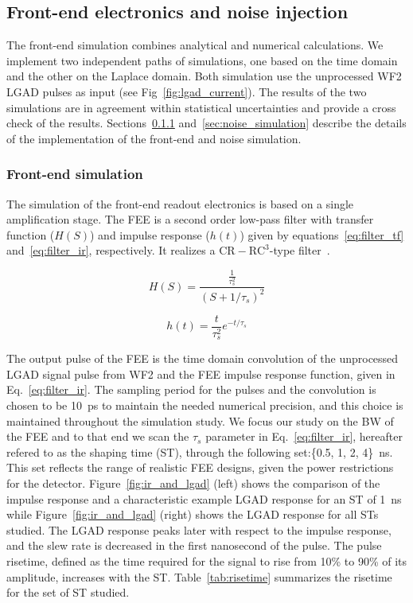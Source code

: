 \documentclass[preprint,1p]{elsarticle}
\begin{document}
\subsection{Front-end electronics and noise injection}
\label{sub_sec:fee_simulation_and_noise} The front-end simulation combines
analytical and numerical calculations. We implement two independent
paths of simulations, one based on the time domain and the other on the Laplace domain.
Both simulation use the unprocessed WF2 LGAD pulses as input (see Fig~\ref{fig:lgad_current}).
The results of the two simulations are in agreement within statistical uncertainties and provide a
cross check of the results. Sections~\ref{sec:fee}
and~\ref{sec:noise_simulation} describe the details of the implementation of the
front-end and noise simulation. 

\subsubsection{Front-end simulation}\label{sec:fee}
The simulation of the front-end readout electronics is based on a single amplification stage. 
The FEE is a second order low-pass filter with transfer function ($H(S)$)
and impulse response ($h(t)$) given by equations~\ref{eq:filter_tf} and~\ref{eq:filter_ir}, respectively.
It realizes a $\mathrm{CR-RC}^{3}$-type filter~\cite{Sansen}.
 
 \begin{equation}\label{eq:filter_tf}
   H(S) = \frac{\frac{1}{\tau_{s}^{2}}}{(S+1/\tau_{s})^{2}}
 \end{equation}
 
 \begin{equation}\label{eq:filter_ir}
     h(t) = \frac{t}{\tau_s^2}e^{-t/\tau_{s}}
 \end{equation}
 
The output pulse of the FEE is the time domain convolution of the
unprocessed LGAD signal pulse from WF2 and the FEE impulse response function,
given in Eq.~\ref{eq:filter_ir}. The sampling period for the pulses and the
convolution is chosen to be 10~\si{ps} to maintain the needed numerical 
precision, and this choice is maintained throughout the simulation study. 
We focus our study on the BW of the FEE and to that
end we scan the $\tau_{s}$ parameter in Eq.~\ref{eq:filter_ir}, hereafter refered to as
the shaping time (ST),  through the following set:\{0.5, 1, 2, 4\}~\si{ns}. 
This set reflects the range of realistic FEE designs, given the power restrictions 
for the detector. Figure~\ref{fig:ir_and_lgad} (left) shows the comparison of the
impulse response and a characteristic example LGAD response for an ST of 1~\si{ns} while
Figure~\ref{fig:ir_and_lgad} (right) shows the LGAD response for all STs
studied. The LGAD response peaks later with respect to the
impulse response, and the slew rate is decreased in the first nanosecond
of the pulse. The pulse risetime, defined as the time required for the signal to rise from 10\% to 90\% of its
amplitude,  increases with the ST. Table~\ref{tab:risetime} summarizes the risetime
for the set of ST studied. 
\end{document}
